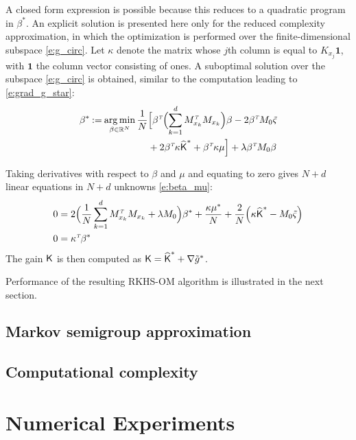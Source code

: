 A closed form expression is possible because this reduces to a quadratic program in $\beta^*$. An explicit solution is presented here only for the reduced complexity approximation, in which the optimization is performed over the finite-dimensional subspace \eqref{e:g_circ}. Let $\kappa$ denote the matrix whose $j$th column is equal to $K_{x_j}\pmb{1}$,  with $\pmb{1}$ the column vector consisting of ones.   A suboptimal solution over the subspace \eqref{e:g_circ} is obtained, similar to the computation leading to   \eqref{e:grad_g_star}:
\begin{equation}
\begin{aligned}
\beta ^* \mathbin{:=}
\mathop{\rm arg{\,}min}_{\beta  \in \mathbb{R}^N} \frac{1}{N} & \Bigl[  \beta ^{\hbox{\tiny\it T}} \Bigl( \sum_{k=1}^d M_{x_k}^{\hbox{\tiny\it T}} M_{x_k} \Bigr) \beta   - 2 \beta ^{\hbox{\tiny\it T}}  M_0 \tilde{\varsigma}  \\
& + 2 \beta ^{\hbox{\tiny\it T}} \kappa \widehat{\text{\sf K}}^* + \beta ^{\hbox{\tiny\it T}} \kappa \mu  \Bigr]+ \lambda \beta ^{\hbox{\tiny\it T}}  M_0 \beta
\end{aligned}
\end{equation}

Taking derivatives with respect to $\beta $ and $\mu $ and equating to zero gives $N+d$ linear equations in $N+d$ unknowns \eqref{e:beta_mu}:
\begin{equation}
\begin{aligned}
0  &=  2 \Bigl(  \frac{1}{N}  \sum_{k=1}^d M_{x_k}^\transpose M_{x_k}   +  \lambda M_0 \Bigr) \beta ^* + \frac{ \kappa \mu ^*}{N}+  \frac{2}{N} \Bigl( \kappa \hakFPF^*  -   M_0 \vectilc \Bigr)  \\
0  & = \kappa^{\transpose} \beta^*
\label{e:beta_mu}
\end{aligned}
\end{equation}
The gain $\text{\sf K}$ is then computed as
$
\text{\sf K} = \widehat{\text{\sf K}}^* + \nabla \tilde g^*$.

Performance of the resulting RKHS-OM algorithm is illustrated in the next section.




\subsection{Markov semigroup approximation}
\subsection{Computational complexity}

\section{Numerical Experiments}
\label{s:fpf_numerics}

